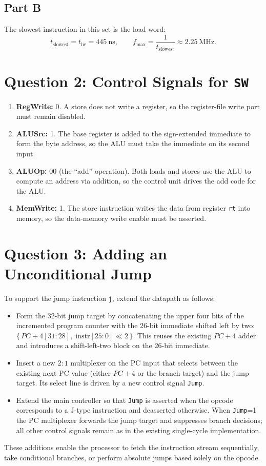 \documentclass[12pt]{article}
\begin{document}
\subsection*{Part B}
The slowest instruction in this set is the load word:
\[
t_{\text{slowest}} = t_{\text{lw}} = \SI{445}{\nano\second},
\qquad
f_{\max} = \frac{1}{t_{\text{slowest}}} \approx \SI{2.25}{\mega\hertz}.
\]

\section*{Question 2: Control Signals for \texttt{SW}}
\begin{enumerate}
  \item \textbf{RegWrite:} 0. A store does not write a register, so the register-file write port must remain disabled.
  \item \textbf{ALUSrc:} 1. The base register is added to the sign-extended immediate to form the byte address, so the ALU must take the immediate on its second input.
  \item \textbf{ALUOp:} 00 (the ``add'' operation). Both loads and stores use the ALU to compute an address via addition, so the control unit drives the add code for the ALU.
  \item \textbf{MemWrite:} 1. The store instruction writes the data from register \texttt{rt} into memory, so the data-memory write enable must be asserted.
\end{enumerate}

\section*{Question 3: Adding an Unconditional Jump}
To support the jump instruction \texttt{j}, extend the datapath as follows:
\begin{itemize}
  \item Form the 32-bit jump target by concatenating the upper four bits of the incremented program counter with the 26-bit immediate shifted left by two: $\{\,PC{+}4[31{:}28],\; \text{instr}[25{:}0]\ll 2\,\}$. This reuses the existing $PC+4$ adder and introduces a shift-left-two block on the 26-bit immediate.
  \item Insert a new $2{:}1$ multiplexer on the PC input that selects between the existing next-PC value (either $PC+4$ or the branch target) and the jump target. Its select line is driven by a new control signal \texttt{Jump}.
  \item Extend the main controller so that \texttt{Jump} is asserted when the opcode corresponds to a J-type instruction and deasserted otherwise. When \texttt{Jump}=1 the PC multiplexer forwards the jump target and suppresses branch decisions; all other control signals remain as in the existing single-cycle implementation.
\end{itemize}
These additions enable the processor to fetch the instruction stream sequentially, take conditional branches, or perform absolute jumps based solely on the opcode.
\end{document}
